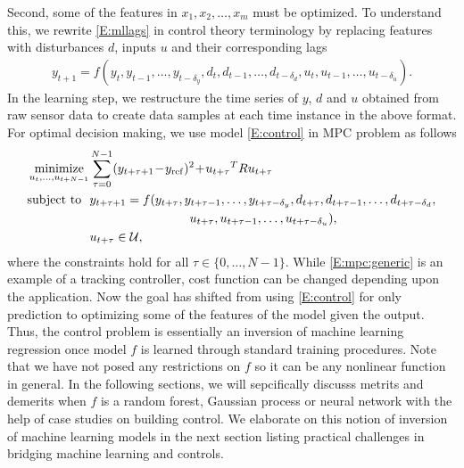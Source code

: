 Second, some of the features in \( x_1, x_2, \dots, x_m \) must be optimized.
To understand this, we rewrite \eqref{E:mllags} in control theory terminology by replacing features with disturbances \(d\), inputs \(u\) and their corresponding lags
\begin{align}
y_{t+1} = f\left( y_{t}, y_{t-1}, \dots, y_{t-\delta_y}, d_{t}, d_{t-1}, \dots, d_{t-\delta_d}, u_{t}, u_{t-1}, \dots, u_{t-\delta_u} \right).
\label{E:control}
\end{align}
In the learning step, we restructure the time series of \(y\), \(d\) and \(u\) obtained from raw sensor data to create data samples at each time instance in the above format.
For optimal decision making, we use model \eqref{E:control} in MPC problem as follows
\begin{align}
& \minimize_{u_{t}, \dots, u_{t+N-1}} \sum_{\tau=0}^{N-1} (y_{t+\tau+1}\!-\!y_{\mathrm{ref}})^2 \!+\! {u_{t+\tau}}^T R {u_{t+\tau}} \label{E:mpc:generic} \\
& 
\begin{aligned}
\st\ \ 
& y_{t+\tau+1} = f ( y_{t+\tau}, y_{t+\tau-1}, \dots, y_{t+\tau-\delta_y}, d_{t+\tau}, d_{t+\tau-1}, \dots, d_{t+\tau-\delta_d}, \\
& \qquad\qquad\qquad\qquad u_{t+\tau}, u_{t+\tau-1}, \dots, u_{t+\tau-\delta_u} ), \nonumber \\
& u_{t+\tau} \in \mathcal{U},  \nonumber
\end{aligned}
\end{align}
where the constraints hold for all \(\tau \in \{0,\dots,N-1\}\).
While \eqref{E:mpc:generic} is an example of a tracking controller, cost function can be changed depending upon the application.
Now the goal has shifted from using \eqref{E:control} for only prediction to optimizing some of the features of the model given the output.
Thus, the control problem is essentially an inversion of machine learning regression once model \(f\) is learned through standard training procedures.
Note that we have not posed any restrictions on \(f\) so it can be any nonlinear function in general.
In the following sections, we will sepcifically discusss metrits and demerits when \(f\) is a random forest, Gaussian process or neural network with the help of case studies on building control.
We elaborate on this notion of inversion of machine learning models in the next section listing practical challenges in bridging machine learning and controls.

